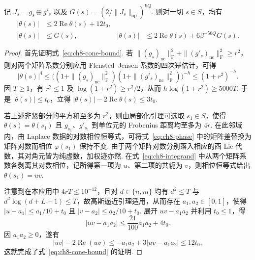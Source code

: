 \begin{lemma}[被积函数的实部及衰减估计]
\label{lem:ch8-pointwise}
记 $J_s=g_s\oplus g'_s$ 以及 $G(s)=(2/\|J_s\|_{\mathrm{op}})^{9Q}$. 则对一切 $s\in S$，均有
\begin{align}
|\theta(s)|&\le 2\operatorname{Re}\theta(s)+12t_0,
\label{eq:ch8-cone-bound}\\
|\theta(s)|&\le G(s),&
|\theta(s)|&\le 2\operatorname{Re}\theta(s)+6\beta^{-50Q}G(s).
\label{eq:ch8-decay}
\end{align}
\end{lemma}
\begin{proof}
首先证明式~\eqref{eq:ch8-cone-bound}. 若 $\|(g_s)_{\mathrm{nc}}\|_{\mathrm F}^2+\|(g'_s)_{\mathrm{nc}}\|_{\mathrm F}^2\ge r^2$，则对两个矩阵系数分别应用 Flensted--Jensen 系数的四次幂估计，可得
\[
 |\theta(s)|^4
 \le \bigl((1+\|(g_s)_{\mathrm{nc}}\|_{\mathrm F}^2)
           (1+\|(g'_s)_{\mathrm{nc}}\|_{\mathrm F}^2)\bigr)^{-h}
 \le (1+r^2)^{-h}.
\]
因 $T\ge1$，有 $r^2\le1$ 及 $\log(1+r^2)\ge r^2/2$，从而 $h\log(1+r^2)\ge 5000T$. 于是 $|\theta(s)|\le t_0$，立得 $|\theta(s)|-2\operatorname{Re}\theta(s)\le3t_0$.

若上述非紧部分的平方和至多为 $r^2$，则由局部化引理可选取 $s_1\in S$，使得 $\theta(s)=\theta(s_1)$ 且 $g_{s_1}$、$g'_{s_1}$ 到单位元的 Frobenius 距离均至多为 $4r$. 在此邻域内，由 Laplace 数据的对数相位恒等式，可将式~\eqref{eq:ch8-phase} 中的矩阵差替换为矩阵对数而相位 $\varphi(s_1)$ 保持不变. 由于两个矩阵对数分别落入相应的酉 Lie 代数，其对角元皆为纯虚数，加权迹亦然. 在式~\eqref{eq:ch8-integrand} 中从两个矩阵系数各剥离其对数相位，记所得第一项为 $u$、第二项的共轭为 $v$，则相位恒等式给出 $\theta(s_1)=uv$.

注意到在本应用中 $4rT\le10^{-12}$，且对 $d\in\{n,m\}$ 均有 $d^2\le T$ 与 $d^2\log(d+L+1)\le T$，故高斯逼近引理适用，从而存在 $a_1,a_2\in[0,1]$，使得 $|u-a_1|\le a_1/10+t_0$ 且 $|v-a_2|\le a_2/10+t_0$. 展开 $uv-a_1a_2$ 并利用 $t_0\le1$，得
\[
 |uv-a_1a_2|\le \frac{21}{100}a_1a_2+4t_0.
\]
因 $a_1a_2\ge0$，遂有
\[
 |uv|-2\operatorname{Re}(uv)
 \le -a_1a_2+3|uv-a_1a_2|\le12t_0,
\]
这就完成了式~\eqref{eq:ch8-cone-bound} 的证明.


\end{proof}

